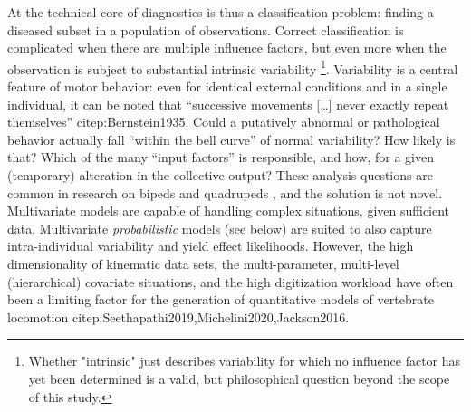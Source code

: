 At the technical core of diagnostics is thus a classification problem: finding a diseased subset in a population of observations.
Correct classification is complicated when there are multiple influence factors, but even more when the observation is subject to substantial intrinsic variability \footnote{Whether "intrinsic" just describes variability for which no influence factor has yet been determined is a valid, but philosophical question beyond the scope of this study.}.
Variability is a central feature of motor behavior: even for identical external conditions and in a single individual, it can be noted that ``successive movements [\ldots{}] never exactly repeat themselves'' citep:Bernstein1935.
Could a putatively abnormal or pathological behavior actually fall ``within the bell curve'' of normal variability?
How likely is that?
Which of the many ``input factors'' is responsible, and how, for a given (temporary) alteration in the collective output?
These analysis questions are common in research on bipeds  \citep[e.g.][]{Ganley2005,StifflerJoachim2020,Bruton2013} and quadrupeds  \citep[e.g.][]{Irschick1999,Pike2002,Stavrakakis2014}, and the solution is not novel.
Multivariate models are capable of handling complex situations, given sufficient data.
Multivariate \emph{probabilistic} models (see below) are suited to also capture intra-individual variability and yield effect likelihoods.
However, the high dimensionality of kinematic data sets, the multi-parameter, multi-level (hierarchical) covariate situations, and the high digitization workload have often been a limiting factor for the generation of quantitative models of vertebrate locomotion citep:Seethapathi2019,Michelini2020,Jackson2016.


\bigskip

